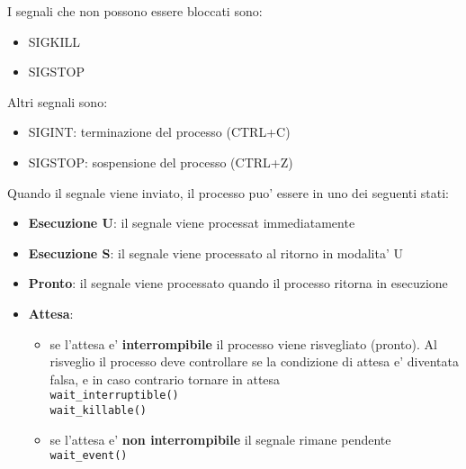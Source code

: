 \documentclass[12pt, a4paper]{report}
\begin{document}
I segnali che non possono essere bloccati sono:
\begin{itemize}
	\item SIGKILL
	\item SIGSTOP
\end{itemize}
Altri segnali sono:
\begin{itemize}
	\item SIGINT: terminazione del processo (CTRL+C)
	\item SIGSTOP: sospensione del processo (CTRL+Z)
\end{itemize}
Quando il segnale viene inviato, il processo puo' essere in uno dei seguenti
stati:
\begin{itemize}
	\item \textbf{Esecuzione U}: il segnale viene processat immediatamente
	\item \textbf{Esecuzione S}: il segnale viene processato al ritorno in
	      modalita' U
	\item \textbf{Pronto}: il segnale viene processato quando il processo
	      ritorna in esecuzione
	\item \textbf{Attesa}:
	      \begin{itemize}
			  \item se l'attesa e' \textbf{interrompibile} il processo viene
				  risvegliato (pronto). Al risveglio il processo deve
				  controllare se la condizione di attesa e' diventata falsa, e
				  in caso contrario tornare in attesa\\
			  \texttt{wait\_interruptible()}\\
			  \texttt{wait\_killable()}
			  \item se l'attesa e' \textbf{non interrompibile} il segnale rimane
				  pendente\\
			  \texttt{wait\_event()}
	      \end{itemize} 
\end{itemize}

\end{document}
